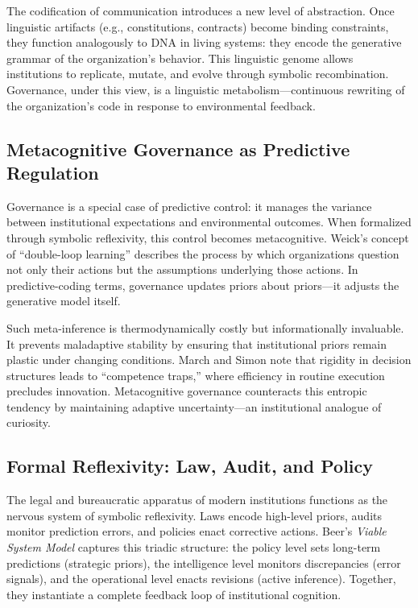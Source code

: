 \documentclass[11pt,a4paper]{article}
\begin{document}
The codification of communication introduces a new level of abstraction.  Once linguistic artifacts (e.g., constitutions, contracts) become binding constraints, they function analogously to DNA in living systems: they encode the generative grammar of the organization’s behavior.  This linguistic genome allows institutions to replicate, mutate, and evolve through symbolic recombination.  Governance, under this view, is a linguistic metabolism—continuous rewriting of the organization’s code in response to environmental feedback.

\subsection{Metacognitive Governance as Predictive Regulation}

Governance is a special case of predictive control: it manages the variance between institutional expectations and environmental outcomes.  When formalized through symbolic reflexivity, this control becomes metacognitive.  Weick’s concept of “double-loop learning” \citep{Weick1979SocialPsychOrganization} describes the process by which organizations question not only their actions but the assumptions underlying those actions.  In predictive-coding terms, governance updates priors about priors—it adjusts the generative model itself.

Such meta-inference is thermodynamically costly but informationally invaluable.  It prevents maladaptive stability by ensuring that institutional priors remain plastic under changing conditions.  March and Simon \citep{MarchSimon1958Organizations} note that rigidity in decision structures leads to “competence traps,” where efficiency in routine execution precludes innovation.  Metacognitive governance counteracts this entropic tendency by maintaining adaptive uncertainty—an institutional analogue of curiosity.

\subsection{Formal Reflexivity: Law, Audit, and Policy}

The legal and bureaucratic apparatus of modern institutions functions as the nervous system of symbolic reflexivity.  Laws encode high-level priors, audits monitor prediction errors, and policies enact corrective actions.  Beer’s \emph{Viable System Model} \citep{Beer1979BrainOfFirm} captures this triadic structure: the policy level sets long-term predictions (strategic priors), the intelligence level monitors discrepancies (error signals), and the operational level enacts revisions (active inference).  Together, they instantiate a complete feedback loop of institutional cognition.
\end{document}
